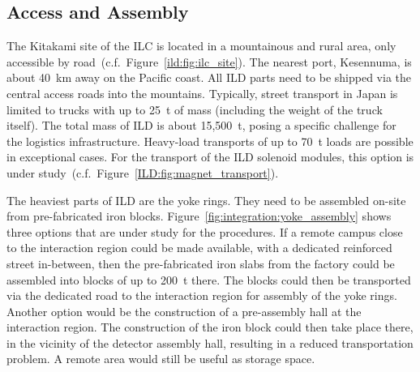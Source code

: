 \subsection{Access and Assembly}
\label{ild:sec:access}
The Kitakami site of the ILC is located in a mountainous and rural area, only accessible by road~(c.f.~Figure~\ref{ild:fig:ilc_site}). The nearest port, Kesennuma, is about 40~km away on the Pacific coast. All ILD parts need to be shipped via the central access roads into the mountains. Typically, street transport in Japan is limited to trucks with up to 25~t of mass (including the weight of the truck itself). The total mass of ILD is about 15,500~t, posing a specific challenge for the logistics infrastructure. Heavy-load transports of up to 70~t loads are possible in exceptional cases. For the transport of the ILD solenoid modules, this option is under study~(c.f.~Figure~\ref{ILD:fig:magnet_transport}).

The heaviest parts of ILD are the yoke rings. They need to be assembled on-site from pre-fabricated iron blocks. Figure~\ref{fig:integration:yoke_assembly} shows three options that are under study for the procedures. If a remote campus close to the interaction region could be made available, with a dedicated reinforced street in-between, then the pre-fabricated iron slabs from the factory could be assembled into blocks of up to 200~t there. The blocks could then be transported via the dedicated road to the interaction region for assembly of the yoke rings. Another option would be the construction of a pre-assembly hall at the interaction region. The construction of the iron block could then take place there, in the vicinity of the detector assembly hall, resulting in a reduced transportation problem. A remote area would still be useful as storage space. 


